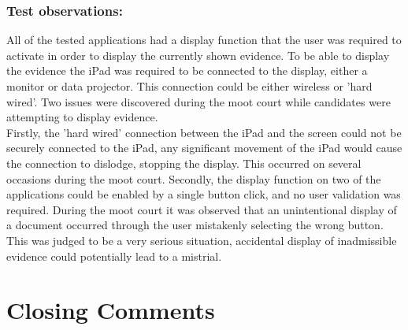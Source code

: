 \documentclass{article}
\begin{document}
\subsubsection{Test observations:}
All of the tested applications had a display function that the user was required to activate in order to display the currently shown evidence. To be able to display the evidence the iPad was required to be connected to the display, either a monitor or data projector. This connection could be either wireless or 'hard wired'. Two issues were discovered during the moot court while candidates were attempting to display evidence. \\
Firstly, the 'hard wired' connection between the iPad and the screen could not be securely connected to the iPad, any significant movement of the iPad would cause the connection to dislodge, stopping the display. This occurred on several occasions during the moot court.
Secondly, the display function on two of the applications could be enabled by a single button click, and no user validation was required. During the moot court it was observed that an unintentional display of a document occurred through the user mistakenly selecting the wrong button. This was judged to be a very serious situation, accidental display of inadmissible evidence could potentially lead to a mistrial.



\section{Closing Comments}
\end{document}
